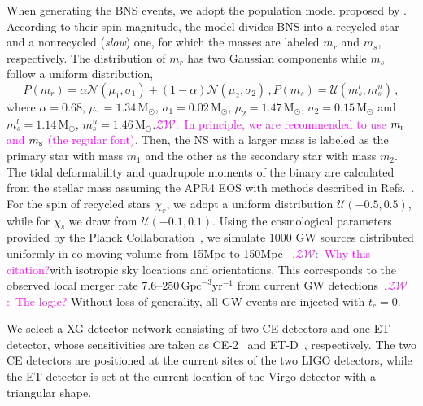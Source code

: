 \documentclass[a4paper,11pt]{article}
\newcommand{\ZW}[1]{\textcolor{magenta}{$\mathcal{ZW}$:~#1}}
\begin{document}
When generating the BNS events, we adopt the population model proposed by \citet{Farrow:2019xnc}. 
According to their spin magnitude, the model divides BNS into a recycled star and a nonrecycled 
(\emph{slow}) one, for which the masses are labeled $m_r$ and $m_s$, respectively. 
The distribution of $m_r$ has two Gaussian components while $m_s$ follow a uniform distribution,
\begin{subequations}
\label{mass population}
\begin{equation}
    P(m_r) = \alpha \mathcal{N}(\mu_1, \sigma_1) + (1-\alpha) \mathcal{N}(\mu_2, \sigma_2)\,,
\end{equation}
\begin{equation}
    P(m_s) = \mathcal{U}(m_s^l, m_s^u)\,,
\end{equation}
\end{subequations}
where $\alpha=0.68$, $\mu_1=1.34\,\mathrm{M}_{\odot}$, $\sigma_1=0.02\,\mathrm{M}_
{\odot}$, $\mu_2=1.47\,\mathrm{M}_{\odot}$, $\sigma_2=0.15\,\mathrm{M}_{\odot}$ 
and $m_s^l=1.14\,\mathrm{M}_{\odot}$, $m_s^u=1.46\,\mathrm{M}_{\odot}$.\ZW{In
principle, we are recommended to use $m_{\rm r}$ and $m_{\rm s}$ (the regular
font).
} Then, the NS with a larger mass is labeled as the primary star with mass $m_1$ and the other as the secondary star with mass $m_2$.
The tidal deformability and quadrupole moments of the binary are calculated from 
the stellar mass assuming the APR4 EOS with methods described in Refs.~\cite{Yagi:2013awa,Atta:2024ckt}. For the spin of recycled stars $\chi_r$, we adopt a uniform distribution $\mathcal{U}(-0.5,0.5)$, 
while for $\chi_s$ we draw from $\mathcal{U}(-0.1,0.1)$.
Using the cosmological parameters provided by the Planck Collaboration~\cite{Planck:2018vyg}, 
we simulate 1000 GW sources distributed uniformly in co-moving volume from 15Mpc to 150Mpc
~\cite{Fishbach:2018edt,KAGRA:2021duu},\ZW{Why this citation?}with isotropic sky locations and orientations. 
This corresponds to the observed local merger rate $7.6$--$250\,\mathrm{Gpc}^{-3}\mathrm{yr}^{-1}$ from current GW 
detections~\cite{LIGOScientific:2025pvj,LIGOScientific:2020aai}.\ZW{The logic?} Without loss of generality, all GW events are injected with $t_c=0$.

We select a XG detector network consisting of two CE detectors and one ET 
detector, whose sensitivities are taken as CE-2~\cite{Reitze:2019iox,Reitze:2019dyk} 
and ET-D~\cite{Punturo:2010zz,Hild:2010id,Sathyaprakash:2012jk}, respectively. 
The two CE detectors are positioned at the current sites of the two LIGO detectors, 
while the ET detector is set at the current location of the Virgo detector with a triangular shape. 
\end{document}
